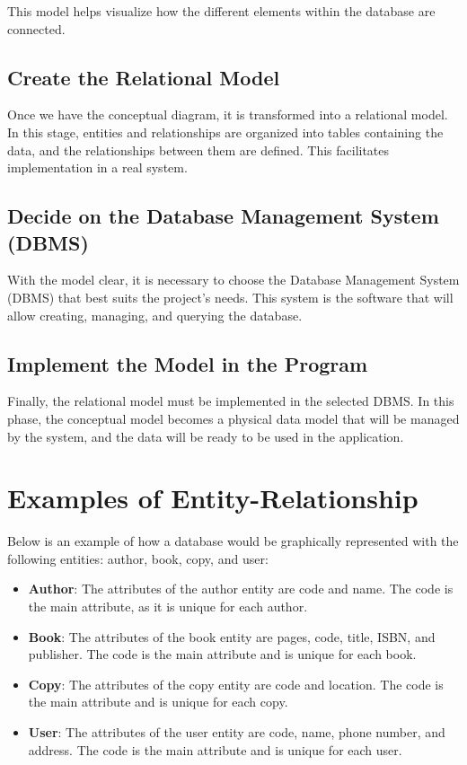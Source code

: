 \documentclass{article}
\begin{document}
This model helps visualize how the different elements within the database are connected.

\subsection{Create the Relational Model}

Once we have the conceptual diagram, it is transformed into a relational model. In this stage, entities and relationships are organized into tables containing the data, and the relationships between them are defined. This facilitates implementation in a real system.

\subsection{Decide on the Database Management System (DBMS)}

With the model clear, it is necessary to choose the Database Management System (DBMS) that best suits the project's needs. This system is the software that will allow creating, managing, and querying the database.

\subsection{Implement the Model in the Program}

Finally, the relational model must be implemented in the selected DBMS. In this phase, the conceptual model becomes a physical data model that will be managed by the system, and the data will be ready to be used in the application.

\section{Examples of Entity-Relationship}

Below is an example of how a database would be graphically represented with the following entities: author, book, copy, and user:

\begin{itemize}
    \item \textbf{Author}: The attributes of the author entity are code and name. The code is the main attribute, as it is unique for each author.
    \item \textbf{Book}: The attributes of the book entity are pages, code, title, ISBN, and publisher. The code is the main attribute and is unique for each book.
    \item \textbf{Copy}: The attributes of the copy entity are code and location. The code is the main attribute and is unique for each copy.
    \item \textbf{User}: The attributes of the user entity are code, name, phone number, and address. The code is the main attribute and is unique for each user.
\end{itemize}
\end{document}
